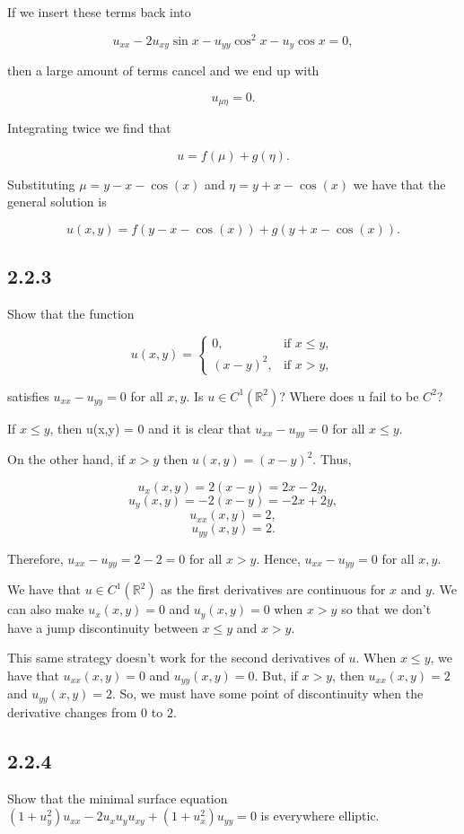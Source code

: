 \documentclass{article}
\begin{document}
\begin{flushleft}
If we insert these terms back into 

$$u_{xx}-2u_{xy}\sin{x}-u_{yy}\cos^2{x}-u_y\cos{x}=0,$$ 

then a large amount of terms cancel and we end up with

$$u_{\mu\eta}=0.$$

Integrating twice we find that

$$u=f(\mu) + g(\eta).$$

Substituting $\mu=y-x-\cos(x)$ and $\eta=y+x-\cos(x)$ we have that the general solution is

$$u(x,y)=f(y-x-\cos(x)) + g(y+x-\cos(x)).$$

\subsection{\textbf{2.2.3}} Show that the function

\[
  u(x,y) =
  \begin{cases}
  0, & \text{if $x\leq y$}, \\
  (x-y)^2, & \text{if $x > y$,}
  \end{cases}
\]

satisfies $u_{xx}-u_{yy}=0$ for all $x,y$. Is $u\in C^1(\mathbb R^2)$? Where does u fail to be $C^2$?

If $x\leq y$, then u(x,y) = 0 and it is clear that $u_{xx}-u_{yy}=0$ for all $x\leq y$.

On the other hand, if $x > y$ then $u(x,y)=(x-y)^2$. Thus,

$$u_x(x,y)=2(x-y)=2x-2y,$$
$$u_y(x,y)=-2(x-y)=-2x+2y,$$
$$u_{xx}(x,y)=2,$$
$$u_{yy}(x,y)=2.$$

Therefore, $u_{xx}-u_{yy}=2-2=0$ for all $x > y$. Hence, $u_{xx}-u_{yy}=0$ for all $x,y$.

We have that $u\in C^1(\mathbb R^2)$ as the first derivatives are continuous for $x$ and $y$. We can also make $u_x(x,y)=0$ and $u_y(x,y)=0$ when $x > y$ so that we don't have a jump discontinuity between $x\leq y$ and $x > y$.

This same strategy doesn't work for the second derivatives of $u$. When $x\leq y$, we have that $u_{xx}(x,y)=0$ and $u_{yy}(x,y)=0$. But, if $x > y$, then $u_{xx}(x,y)=2$ and $u_{yy}(x,y)=2$. So, we must have some point of discontinuity when the derivative changes from $0$ to $2$.

\subsection{\textbf{2.2.4}} Show that the minimal surface equation $(1+u_y^2)u_{xx}-2u_xu_yu_{xy}+(1+u_x^2)u_{yy}=0$ is everywhere elliptic.


\end{flushleft}
\end{document}
